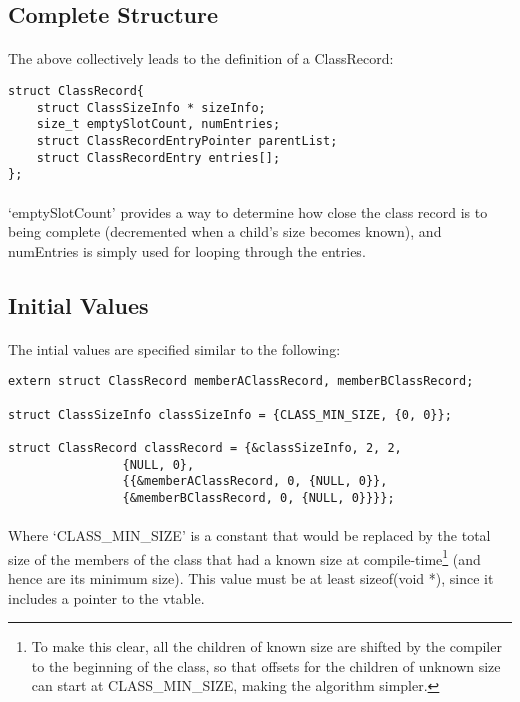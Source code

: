 \documentclass{article}
\begin{document}
\subsection{Complete Structure}

\paragraph{}
The above collectively leads to the definition of a ClassRecord:

\begin{lstlisting}
struct ClassRecord{
	struct ClassSizeInfo * sizeInfo;
	size_t emptySlotCount, numEntries;
	struct ClassRecordEntryPointer parentList;
	struct ClassRecordEntry entries[];
};
\end{lstlisting}

\paragraph{}
`emptySlotCount' provides a way to determine how close the class record is to being complete (decremented when a child's size becomes known), and numEntries is simply used for looping through the entries.

\subsection{Initial Values}

\paragraph{}
The intial values are specified similar to the following:

\begin{lstlisting}
extern struct ClassRecord memberAClassRecord, memberBClassRecord;

struct ClassSizeInfo classSizeInfo = {CLASS_MIN_SIZE, {0, 0}};

struct ClassRecord classRecord = {&classSizeInfo, 2, 2,
				{NULL, 0},
				{{&memberAClassRecord, 0, {NULL, 0}},
				{&memberBClassRecord, 0, {NULL, 0}}}};
\end{lstlisting}

\paragraph{}
Where `CLASS\_MIN\_SIZE' is a constant that would be replaced by the total size of the members of the class that had a known size at compile-time\footnote{To make this clear, all the children of known size are shifted by the compiler to the beginning of the class, so that offsets for the children of unknown size can start at CLASS\_MIN\_SIZE, making the algorithm simpler.} (and hence are its minimum size). This value must be at least sizeof(void *), since it includes a pointer to the vtable.
\end{document}
